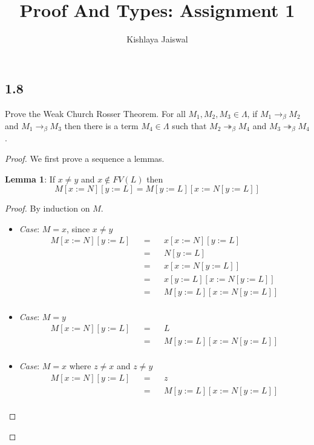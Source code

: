 \documentclass[12pt]{article}
\title{Proof And Types: Assignment 1}
\author{Kishlaya Jaiswal}
\begin{document}
\maketitle

\vspace{0.5in}

\subsection*{1.8}
Prove the Weak Church Rosser Theorem. For all $M_1, M_2, M_3 \in \Lambda$, if $M_1 \rightarrow_\beta M_2$ and $M_1 \rightarrow_\beta M_3$ then there is a term $M_4 \in \Lambda$ such that $M_2 \twoheadrightarrow_\beta M_4$ and $M_3 \twoheadrightarrow_\beta M_4$. \\

\begin{proof}

We first prove a sequence a lemmas.

\textbf{Lemma 1}: If $x \neq y$ and $x \not \in FV(L)$ then $$M[x:=N][y:=L] = M[y:=L][x:=N[y:=L]]$$

\begin{proof}
By induction on $M$.
\begin{itemize}
\item \textsl{Case}: $M=x$, since $x \neq y$
\begin{align*}
    M[x:=N][y:=L] &&=&& x[x:=N][y:=L] \\
    &&=&& N[y:=L] \\
    &&=&& x[x:=N[y:=L]] \\
    &&=&& x[y:=L][x:=N[y:=L]] \\
    &&=&& M[y:=L][x:=N[y:=L]] \\
\end{align*}

\item \textsl{Case}: $M=y$
\begin{align*}
    M[x:=N][y:=L] &&=&& L \\
    &&=&& M[y:=L][x:=N[y:=L]] \\
\end{align*}

\item \textsl{Case}: $M=x$ where $z \neq x$ and $z \neq y$
\begin{align*}
    M[x:=N][y:=L] &&=&& z \\
    &&=&& M[y:=L][x:=N[y:=L]] \\
\end{align*}


\end{itemize}
\end{proof}
\end{proof}
\end{document}

